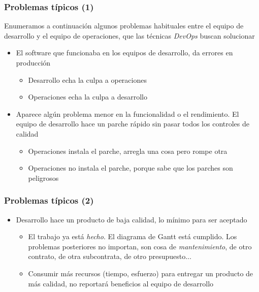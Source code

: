 \documentclass[ucs]{beamer}
\begin{document}
\begin{frame}[fragile]
\frametitle{Problemas típicos (1)}
Enumeramos a continuación algunos problemas habituales entre
el equipo de desarrollo y el equipo de operaciones,
que
las técnicas
\emph{DevOps}
buscan solucionar

\begin{itemize}
\item
El software que funcionaba en los equipos de desarrollo, da errores
en producción 

\begin{itemize}
\item
Desarrollo echa la culpa a operaciones

\item
Operaciones echa la culpa a desarrollo
\end{itemize}


\item
Aparece algún problema menor en la funcionalidad o el rendimiento.
El equipo de desarrollo hace un parche rápido sin pasar todos los
controles de calidad
\begin{itemize}
\item
Operaciones instala el parche, arregla una cosa pero rompe otra
\item
Operaciones no instala el parche, porque sabe que los parches son peligrosos 
\end{itemize}

\end{itemize}
\end{frame}


\begin{frame}[fragile]
\frametitle{Problemas típicos (2)}
\begin{itemize}
\item
Desarrollo hace un producto de baja calidad, lo mínimo para ser
aceptado


\begin{itemize}
\item
El trabajo ya está \emph{hecho}. El diagrama de Gantt
está cumplido. Los problemas posteriores no importan, son cosa de
 \emph{mantenimiento}, de otro contrato, de otra subcontrata,
de otro presupuesto...

\item
Consumir más recursos (tiempo, esfuerzo) para entregar un producto
de más calidad, no reportará beneficios al equipo de desarrollo
\end{itemize}
\end{itemize}

\end{frame}
\end{document}
